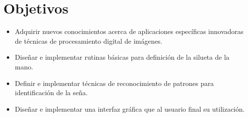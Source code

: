 \section*{Objetivos}

\begin{itemize}
\item Adquirir nuevos conocimientos acerca de aplicaciones específicas innovadoras
de técnicas de procesamiento digital de imágenes.

\bigskip
	\item Diseñar e implementar rutinas básicas para definición de la silueta de la mano.
	\item Definir e implementar técnicas de reconocimiento de patrones para identificación de la seña.
	\item Diseñar e implementar una interfaz gráfica que  al usuario final su utilización.
\end{itemize}

